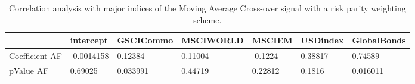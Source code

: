 \begin{table}[H]
\centering
\begin{tabular}{lllllll}
& intercept & GSCICommo & MSCIWORLD & MSCIEM & USDindex & GlobalBonds \\ 
\hline 
Coefficient AF & -0.0014158 & 0.12384 & 0.11004 & -0.1224 & 0.38817 & 0.74589 \\ 
pValue AF & 0.69025 & 0.033991 & 0.44719 & 0.22812 & 0.1816 & 0.016011 \\ 
\hline
\end{tabular}
\caption{Correlation analysis with major indices of the Moving Average Cross-over signal with a risk parity weighting scheme.}
\label{MARP_AFACTOR}
\end{table}